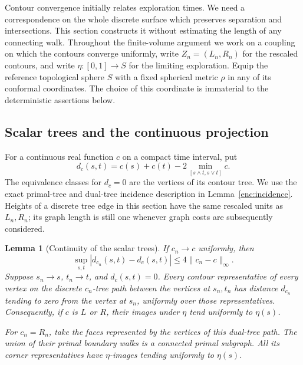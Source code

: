 \documentclass[11pt]{article}
\numberwithin{equation}{section}
\newtheorem{lemma}[theorem]{Lemma}
\theoremstyle{definition}
\theoremstyle{remark}
\newcommand{\1}{\mathbf 1}
\begin{document}
Contour convergence initially relates exploration times.  We need a
correspondence on the whole discrete surface which preserves separation
and intersections.  This section constructs it without estimating the
length of any connecting walk.  Throughout the finite-volume argument we
work on a coupling on which the contours converge uniformly, write
$Z_n=(L_n,R_n)$ for the rescaled contours, and write
$\eta:[0,1]\to S$ for the limiting exploration.  Equip the reference
topological sphere $S$ with a fixed spherical metric $\rho$ in any of its
conformal coordinates.  The choice of this coordinate is immaterial to
the deterministic assertions below.

\subsection{Scalar trees and the continuous projection}

For a continuous real function $c$ on a compact time interval, put
\begin{equation}\label{top:tree-pseudometric}
 d_c(s,t)=c(s)+c(t)-2\min_{[s\wedge t,s\vee t]}c.
\end{equation}
The equivalence classes for $d_c=0$ are the vertices of its contour tree.
We use the exact primal-tree and dual-tree incidence description in
Lemma~\ref{enc:incidence}.  Heights of a discrete tree edge in this
section have the same rescaled units as $L_n,R_n$; its graph length is
still one whenever graph costs are subsequently considered.

\begin{lemma}[Continuity of the scalar trees]\label{top:scalar-trees}
If $c_n\to c$ uniformly, then
\[
 \sup_{s,t}|d_{c_n}(s,t)-d_c(s,t)|
 \le 4\|c_n-c\|_\infty.
\]
Suppose $s_n\to s$, $t_n\to t$, and $d_c(s,t)=0$.
Every contour representative of every vertex on the discrete
$c_n$-tree path between the vertices at $s_n,t_n$ has distance
$d_{c_n}$ tending to zero from the vertex at $s_n$, uniformly over those
representatives.  Consequently, if $c$ is $L$ or $R$, their images under
$\eta$ tend uniformly to $\eta(s)$.

For $c_n=R_n$, take the faces represented by the vertices of this
dual-tree path.  The union of their primal boundary walks is a connected
primal subgraph.  All its corner representatives have $\eta$-images
tending uniformly to $\eta(s)$.
\end{lemma}
\end{document}
